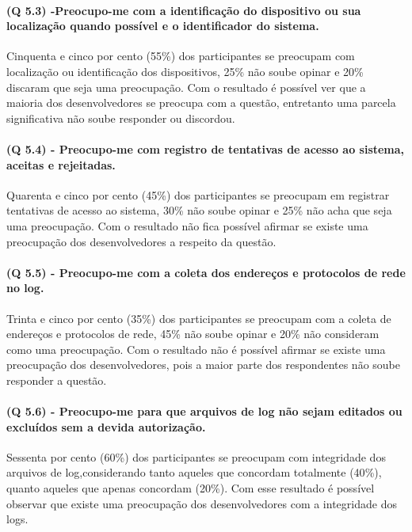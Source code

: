 \paragraph{\textbf{(Q 5.3)} -Preocupo-me com a identificação do dispositivo ou sua localização quando possível e o identificador do sistema.}

Cinquenta e cinco por cento (55{\%}) dos participantes se preocupam com localização ou identificação dos dispositivos, 25{\%} não soube opinar e 20{\%} discaram que seja uma preocupação. Com o resultado é possível ver que a maioria dos desenvolvedores se preocupa com a questão, entretanto uma parcela significativa não soube responder ou discordou.

\paragraph{\textbf{(Q 5.4)} - Preocupo-me com registro de tentativas de acesso ao sistema, aceitas e rejeitadas.}

Quarenta e cinco por cento (45{\%}) dos participantes se preocupam em registrar tentativas de acesso ao sistema, 30{\%} não soube opinar e 25{\%} não acha que seja uma preocupação. Com o resultado não fica possível afirmar se existe uma preocupação dos desenvolvedores a respeito da questão.


\paragraph{\textbf{(Q 5.5)} - Preocupo-me com a coleta dos endereços e protocolos de rede no log.}

Trinta e cinco por cento (35{\%}) dos participantes se preocupam com a coleta de endereços e protocolos de rede, 45{\%} não soube opinar e 20{\%} não consideram como uma preocupação. Com o resultado não é possível afirmar se existe uma preocupação dos desenvolvedores, pois a maior parte dos respondentes não soube responder a questão.

\paragraph{\textbf{(Q 5.6)} - Preocupo-me para que arquivos de log não sejam editados ou excluídos sem a devida autorização.}

Sessenta por cento (60{\%}) dos participantes se preocupam com integridade dos arquivos de log,considerando tanto aqueles que concordam totalmente (40{\%}), quanto aqueles que apenas concordam (20{\%}). Com esse resultado é possível observar que existe uma preocupação dos desenvolvedores com a integridade dos logs.


